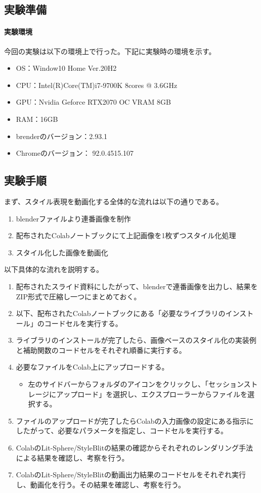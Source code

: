 \documentclass[dvipdfmx]{jsarticle}
\begin{document}
  \subsection{実験準備}
  \paragraph{実験環境}
    今回の実験は以下の環境上で行った。下記に実験時の環境を示す。
    \begin{itemize}
      \item OS：Window10 Home Ver.20H2
      \item CPU：Intel(R)Core(TM)i7-9700K 8cores @ 3.6GHz
      \item GPU：Nvidia Geforce RTX2070 OC VRAM 8GB
      \item RAM：16GB
      \item brenderのバージョン：2.93.1
      \item Chromeのバージョン： 92.0.4515.107
    \end{itemize}
  \subsection{実験手順}
  まず、スタイル表現を動画化する全体的な流れは以下の通りである。
  \begin{enumerate}
    \item blenderファイルより連番画像を制作
    \item 配布されたColabノートブックにて上記画像を1枚ずつスタイル化処理
    \item スタイル化した画像を動画化
  \end{enumerate}
  以下具体的な流れを説明する。
  \begin{enumerate}
    \item 配布されたスライド資料にしたがって、blenderで連番画像を出力し、結果をZIP形式で圧縮し一つにまとめておく。
    \item 以下、配布されたColabノートブックにある「必要なライブラリのインストール」のコードセルを実行する。
    \item ライブラリのインストールが完了したら、画像ベースのスタイル化の実装例と補助関数のコードセルをそれぞれ順番に実行する。
    \item 必要なファイルをColab上にアップロードする。
    \begin{itemize}
      \item 左のサイドバーからフォルダのアイコンをクリックし、「セッションストレージにアップロード」を選択し、エクスプローラーからファイルを選択する。
    \end{itemize}
    \item ファイルのアップロードが完了したらColabの入力画像の設定にある指示にしたがって、必要なパラメータを指定し、コードセルを実行する。
    \item ColabのLit-Sphere/StyleBlitの結果の確認からそれぞれのレンダリング手法による結果を確認し、考察を行う。
    \item ColabのLit-Sphere/StyleBlitの動画出力結果のコードセルをそれぞれ実行し、動画化を行う。その結果を確認し、考察を行う。
  \end{enumerate}
\end{document}
